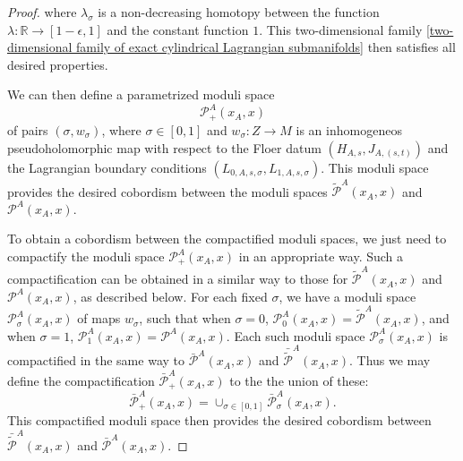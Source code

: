 \documentclass{amsart}
\numberwithin{equation}{section}
\numberwithin{figure}{section}
\begin{document}
\begin{proof}
where $\lambda_{\sigma}$ is a non-decreasing homotopy between the function $\lambda: \mathbb{R} \to [1-\epsilon, 1]$ and the constant function $1$.
This two-dimensional family \eqref{two-dimensional family of exact cylindrical Lagrangian submanifolds} then satisfies all desired properties. \par
	We can then define a parametrized moduli space 
\begin{equation*}
\mathcal{P}_{+}^{A}(x_{A}, x)
\end{equation*}	
of pairs $(\sigma, w_{\sigma})$, where $\sigma \in [0, 1]$ and $w_{\sigma}: Z \to M$ is an inhomogeneos pseudoholomorphic map with respect to the Floer datum $(H_{A, s}, J_{A, (s, t)})$ and the Lagrangian boundary conditions $(L_{0, A, s, \sigma}, L_{1, A, s, \sigma})$. This moduli space provides the desired cobordism between the moduli spaces $\tilde{\mathcal{P}}^{A}(x_{A}, x)$ and $\mathcal{P}^{A}(x_{A}, x)$. \par
	To obtain a cobordism between the compactified moduli spaces, we just need to compactify the moduli space $\mathcal{P}_{+}^{A}(x_{A}, x)$ in an appropriate way. Such a compactification can be obtained in a similar way to those for $\tilde{\mathcal{P}}^{A}(x_{A}, x)$ and $\mathcal{P}^{A}(x_{A}, x)$, as described below. For each fixed $\sigma$, we have a moduli space $\mathcal{P}_{\sigma}^{A}(x_{A}, x)$ of maps $w_{\sigma}$, such that when $\sigma = 0$, $\mathcal{P}_{0}^{A}(x_{A}, x) = \tilde{\mathcal{P}}^{A}(x_{A}, x)$, and when $\sigma = 1$, $\mathcal{P}_{1}^{A}(x_{A}, x) = \mathcal{P}^{A}(x_{A}, x)$. Each such moduli space $\mathcal{P}_{\sigma}^{A}(x_{A}, x)$ is compactified in the same way to $\bar{\mathcal{P}}^{A}(x_{A}, x)$ and $\bar{\tilde{\mathcal{P}}}^{A}(x_{A}, x)$. Thus we may define the compactification $\bar{\mathcal{P}}_{+}^{A}(x_{A}, x)$ to the the union of these:
\begin{equation}
\bar{\mathcal{P}}_{+}^{A}(x_{A}, x) = \cup_{\sigma \in [0, 1]} \bar{\mathcal{P}}_{\sigma}^{A}(x_{A}, x).
\end{equation}
This compactified moduli space then provides the desired cobordism between $\bar{\tilde{\mathcal{P}}}^{A}(x_{A}, x)$ and 
$\bar{\mathcal{P}}^{A}(x_{A}, x)$. \par
\end{proof}
\end{document}
